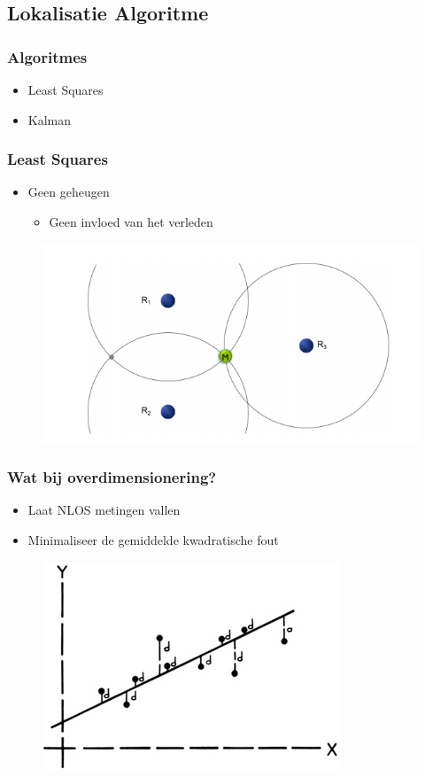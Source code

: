 \documentclass{beamer}
\begin{document}
\subsection{Lokalisatie Algoritme}
  \begin{frame}
    \frametitle{Algoritmes}
    \begin{itemize}
      \item Least Squares
      \item Kalman 
    \end{itemize}
  \end{frame}
  \begin{frame}
    \frametitle{Least Squares}
    \begin{itemize}
      \item Geen geheugen
        \begin{itemize}
          \item Geen invloed van het verleden
        \end{itemize}
    \end{itemize}
      \begin{figure}
      \centering
        \includegraphics[width=.5\textwidth]{images/ranging.png}
    \end{figure}
  \end{frame}
  \begin{frame}
  \frametitle{Wat bij overdimensionering?}

    \begin{itemize}
    \item Laat NLOS metingen vallen
    \item Minimaliseer de gemiddelde kwadratische fout
    \end{itemize}
          \begin{figure}
      \centering
        \includegraphics[width=.5\textwidth]{images/LMS.jpg}
    \end{figure}
  \end{frame}
\end{document}
